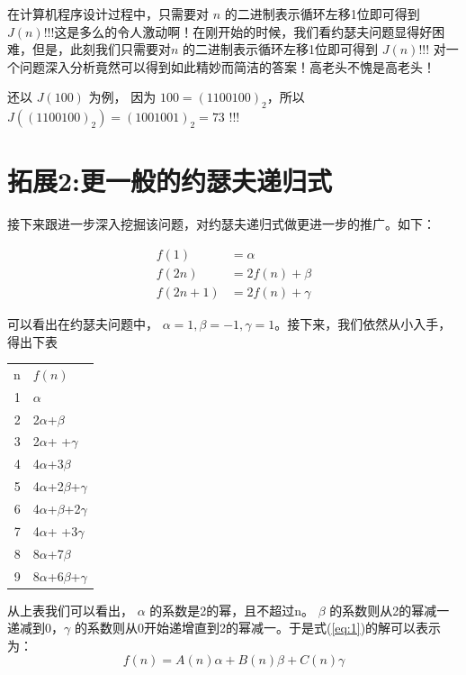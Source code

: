 \documentclass[10pt,a4paper,UTF8]{article}
\begin{document}
在计算机程序设计过程中，只需要对 \(n\) 的二进制表示循环左移1位即可得到 \(J(n)\)!!!这是多么的令人激动啊！在刚开始的时候，我们看约瑟夫问题显得好困难，但是，此刻我们只需要对\(n\) 的二进制表示循环左移1位即可得到 \(J(n)\)!!! 对一个问题深入分析竟然可以得到如此精妙而简洁的答案！高老头不愧是高老头！

还以 \(J(100)\) 为例， 因为 \(100=(1100100)_{2}\)，所以 \(J((1100100)_{2}) = (1001001)_{2} = 73\) !!!
\section{拓展2:更一般的约瑟夫递归式}
\label{sec:orgheadline5}


接下来跟进一步深入挖掘该问题，对约瑟夫递归式做更进一步的推广。如下：

\begin{equation}
\label{eq:8}
\begin{split}
 f(1) &= \alpha \\
 f(2n) &= 2f(n) + \beta \\
 f(2n+1) &= 2f(n) + \gamma
\end{split}
\end{equation}

可以看出在约瑟夫问题中， \(\alpha=1,\beta=-1,\gamma=1\)。接下来，我们依然从小入手，得出下表

\begin{center}
\begin{tabular}{rl}
\hline
n & \(f(n)\)\\
1 & \(\alpha\)\\
\hline
2 & 2\(\alpha\)+\(\beta\)\\
3 & 2\(\alpha\)+  +\(\gamma\)\\
\hline
4 & 4\(\alpha\)+3\(\beta\)\\
5 & 4\(\alpha\)+2\(\beta\)+\(\gamma\)\\
6 & 4\(\alpha\)+\(\beta\)+2\(\gamma\)\\
7 & 4\(\alpha\)+  +3\(\gamma\)\\
\hline
8 & 8\(\alpha\)+7\(\beta\)\\
9 & 8\(\alpha\)+6\(\beta\)+\(\gamma\)\\
\hline
\end{tabular}
\end{center}

从上表我们可以看出， \(\alpha\) 的系数是2的幂，且不超过n。 \(\beta\) 的系数则从2的幂减一递减到0，\(\gamma\) 的系数则从0开始递增直到2的幂减一。于是式(\ref{eq:1})的解可以表示为：
\begin{equation}
\label{eq:9}
f(n) = A(n) \alpha + B(n) \beta + C(n) \gamma
\end{equation}
\end{document}
